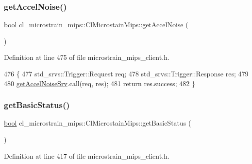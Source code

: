 \subsubsection{\texorpdfstring{get\+Accel\+Noise()}{getAccelNoise()}}
{\footnotesize\ttfamily \hyperlink{classbool}{bool} cl\+\_\+microstrain\+\_\+mips\+::\+Cl\+Microstain\+Mips\+::get\+Accel\+Noise (\begin{DoxyParamCaption}{ }\end{DoxyParamCaption})\hspace{0.3cm}{\ttfamily [inline]}}



Definition at line 475 of file microstrain\+\_\+mips\+\_\+client.\+h.


\begin{DoxyCode}
476     \{
477         std\_srvs::Trigger::Request req;
478         std\_srvs::Trigger::Response res;
479 
480         \hyperlink{classcl__microstrain__mips_1_1ClMicrostainMips_ae34d6cfd5e2e990d2fa3afab20ca9c01}{getAccelNoiseSrv}.call(req, res);
481         \textcolor{keywordflow}{return} res.success;
482     \}
\end{DoxyCode}
\mbox{\label{classcl__microstrain__mips_1_1ClMicrostainMips_a7ba22bfed70ee5796d9776b9438d0908}} 
\subsubsection{\texorpdfstring{get\+Basic\+Status()}{getBasicStatus()}}
{\footnotesize\ttfamily \hyperlink{classbool}{bool} cl\+\_\+microstrain\+\_\+mips\+::\+Cl\+Microstain\+Mips\+::get\+Basic\+Status (\begin{DoxyParamCaption}{ }\end{DoxyParamCaption})\hspace{0.3cm}{\ttfamily [inline]}}



Definition at line 417 of file microstrain\+\_\+mips\+\_\+client.\+h.


